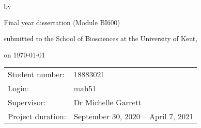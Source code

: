\begin{titlepage}


\begin{center}


{\makeatletter
\largetitlestyle\fontsize{64}{94}\selectfont\@title
\makeatother}

{\makeatletter
\ifx\@subtitle\undefined\else
    \bigskip
   {\tudsffamily\fontsize{22}{32}\selectfont\@subtitle}    
\fi
\makeatother}

\bigskip
\bigskip

by

\bigskip
\bigskip

{\makeatletter
\largetitlestyle\fontsize{26}{26}\selectfont\@author
\makeatother}

\bigskip
\bigskip

Final year dissertation (Module BI600) 

submitted to the School of Biosciences at the University of Kent,

on \today

\vfill

\begin{tabular}{lll}
    Student number: & 18883021 \\
    Login: & mah51 \\
    Supervisor: & Dr Michelle Garrett \\
    Project duration: & \multicolumn{2}{l}{September 30, 2020 -- April 7, 2021} \\
\end{tabular}

\end{center}

\end{titlepage}


